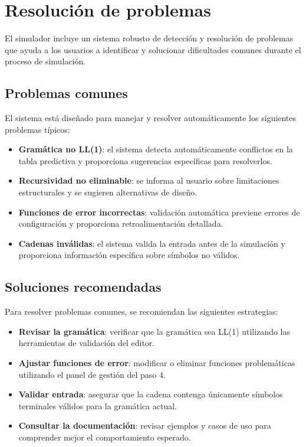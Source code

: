 \section{Resolución de problemas}

El simulador incluye un sistema robusto de detección y resolución de problemas que ayuda a los usuarios a identificar y solucionar dificultades comunes durante el proceso de simulación.

\subsection{Problemas comunes}

El sistema está diseñado para manejar y resolver automáticamente los siguientes problemas típicos:

\begin{itemize}
    \item \textbf{Gramática no LL(1)}: el sistema detecta automáticamente conflictos en la tabla predictiva y proporciona sugerencias específicas para resolverlos.
    \item \textbf{Recursividad no eliminable}: se informa al usuario sobre limitaciones estructurales y se sugieren alternativas de diseño.
    \item \textbf{Funciones de error incorrectas}: validación automática previene errores de configuración y proporciona retroalimentación detallada.
    \item \textbf{Cadenas inválidas}: el sistema valida la entrada antes de la simulación y proporciona información específica sobre símbolos no válidos.
\end{itemize}

\subsection{Soluciones recomendadas}

Para resolver problemas comunes, se recomiendan las siguientes estrategias:

\begin{itemize}
    \item \textbf{Revisar la gramática}: verificar que la gramática sea LL(1) utilizando las herramientas de validación del editor.
    \item \textbf{Ajustar funciones de error}: modificar o eliminar funciones problemáticas utilizando el panel de gestión del paso 4.
    \item \textbf{Validar entrada}: asegurar que la cadena contenga únicamente símbolos terminales válidos para la gramática actual.
    \item \textbf{Consultar la documentación}: revisar ejemplos y casos de uso para comprender mejor el comportamiento esperado.
\end{itemize}

